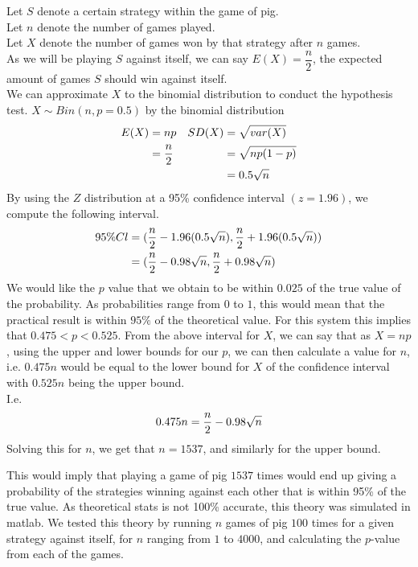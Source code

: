 \documentclass[a4paper,titlepage]{article}
\begin{document}
Let $S$ denote a certain strategy within the game of pig.\\ Let $n$ denote the number of games played.\\Let $X$ denote the number of games won by that strategy after $n$ games.\\ As we will be playing $S$ against itself, we can say $E(X)=\dfrac{n}{2}$, the expected amount of games $S$ should win against itself. \\We can approximate $X$ to the binomial distribution to conduct the hypothesis test. $X \sim Bin(n , p=0.5)$
by the binomial distribution
\begin{align}
E(X) &= np & SD(X) &= \sqrt{var(X)}\notag\\
&= \dfrac{n}{2} & &= \sqrt{np(1-p)}\notag\\
& & &= 0.5\sqrt{n} \notag
\end{align}
By using the $Z$ distribution at a 95\% confidence interval $(z=1.96)$, we compute the following interval.
\begin{align}
95\%Cl &= (\dfrac{n}{2} -1.96(0.5\sqrt{n}), \dfrac{n}{2} +1.96(0.5\sqrt{n}))\notag\\
&= (\dfrac{n}{2}-0.98\sqrt{n}, \dfrac{n}{2}+0.98\sqrt{n})
\notag
\end{align}
We would like the $p$ value that we obtain to be within $0.025$ of the true value of the probability. As probabilities range from $0$ to $1$, this would mean that the practical result is within $95\%$ of the theoretical value. For this system this implies that $0.475<p<0.525$. From the above interval for $X$, we can say that as $X=np$, using the upper and lower bounds for our $p$, we can then calculate a value for $n$, i.e. $0.475n$ would be equal to the lower bound for $X$ of the confidence interval with $0.525n$ being the upper bound.\\I.e.
\begin{equation}
0.475n=\dfrac{n}{2}-0.98\sqrt{n}
\notag
\end{equation}
Solving this for $n$, we get that $n=1537$, and similarly for the upper bound.

This would imply that playing a game of pig $1537$ times would end up giving a probability of the strategies winning against each other that is within 95\% of the true value. As theoretical stats is not 100\% accurate, this theory was simulated in matlab. We tested this theory by running $n$ games of pig $100$ times for a given strategy against itself, for $n$ ranging from $1$ to $4000$, and calculating the $p$-value from each of the games.
\end{document}
